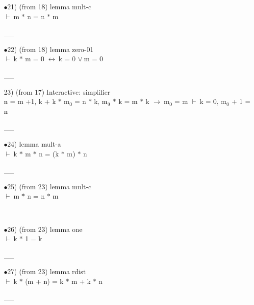 \documentclass[a4paper]{article}
\newcommand{\Fol}{\mbox{$\vdash\ $}}
\newcommand{\Or}{\mbox{$\vee\ $}}
\newcommand{\Imp}{\mbox{$\rightarrow\ $}}
\newcommand{\Equiv}{\mbox{$\leftrightarrow\ $}}
\begin{document}
$\bullet$21)  (from 18) lemma mult-c \\
 \Fol m $*$ n = n $*$ m

\vspace{-1.5ex}\_\hrulefill \_

$\bullet$22)  (from 18) lemma zero-01 \\
 \Fol k $*$ m = 0 \Equiv k = 0 \Or m = 0

\vspace{-1.5ex}\_\hrulefill \_

23)  (from 17) Interactive: simplifier \\
n = m +1, k + k $*$ $\mbox{m}_{0}$ = n $*$ k, $\mbox{m}_{0}$ $*$ k = m $*$ k \Imp $\mbox{m}_{0}$ = m \Fol k = 0, $\mbox{m}_{0}$ + 1 = n

\vspace{-1.5ex}\_\hrulefill \_

$\bullet$24) lemma mult-a \\
 \Fol k $*$ m $*$ n = (k $*$ m) $*$ n

\vspace{-1.5ex}\_\hrulefill \_

$\bullet$25)  (from 23) lemma mult-c \\
 \Fol m $*$ n = n $*$ m

\vspace{-1.5ex}\_\hrulefill \_

$\bullet$26)  (from 23) lemma one \\
 \Fol k $*$ 1 = k

\vspace{-1.5ex}\_\hrulefill \_

$\bullet$27)  (from 23) lemma rdist \\
 \Fol k $*$ (m + n) = k $*$ m + k $*$ n

\vspace{-1.5ex}\_\hrulefill \_
\end{document}
